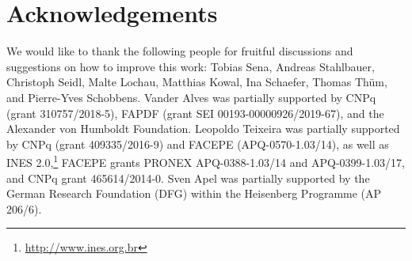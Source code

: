 \documentclass[acmsmall,colorlinks, dvipsnames]{acmart}
\begin{document}
%    










\section*{Acknowledgements}

We would like to thank the following people for fruitful discussions and suggestions on how to improve this work: Tobias Sena, Andreas Stahlbauer, Christoph Seidl, Malte Lochau, Matthias Kowal, Ina Schaefer, Thomas Th{\"u}m, and Pierre-Yves Schobbens. 
Vander Alves was partially supported by CNPq (grant 310757/2018-5), FAPDF (grant SEI 00193-00000926/2019-67), and the Alexander von Humboldt Foundation.
Leopoldo Teixeira was partially supported by CNPq (grant 409335/2016-9) and FACEPE (APQ-0570-1.03/14), as well as INES 2.0,\footnote{\url{http://www.ines.org.br}} FACEPE grants PRONEX APQ-0388-1.03/14 and APQ-0399-1.03/17, and CNPq grant 465614/2014-0.
Sven Apel was partially supported by the German Research Foundation (DFG) within the Heisenberg Programme (AP 206/6).

%


%
%
%
%
\end{document}
